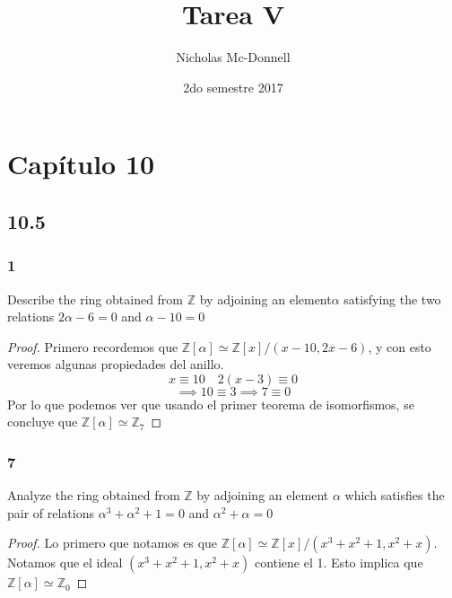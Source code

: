 \documentclass[11pt]{article}
\title{Tarea V}
\author{Nicholas Mc-Donnell}
\date{2do semestre 2017}
\newcommand{\set}[1]{\mathbb{#1}}
\theoremstyle{definition}
\begin{document}
        \maketitle
        \newpage
        
        \clearpage\null\newpage

        \tableofcontents
        \newpage

        \clearpage\null\newpage
        
        \section{Capítulo 10}
        \subsection{10.5}
        \subsubsection{1}
        Describe the ring obtained from $\set{Z}$ by adjoining an element$\alpha$ satisfying the two relations $2\alpha-6=0$ and $\alpha-10=0$
        \begin{proof}
            Primero recordemos que $\set{Z}[\alpha]\simeq\set{Z}[x]/(x-10,2x-6)$, y con esto veremos algunas propiedades del anillo.
            \[x\equiv 10\quad2(x-3)\equiv0\]
            \[\implies 10\equiv 3\implies 7\equiv 0\]
            Por lo que podemos ver que usando el primer teorema de isomorfismos, se concluye que $\set{Z}[\alpha]\simeq\set{Z}_7$
        \end{proof}

        \subsubsection{7}
        Analyze the ring obtained from $\set{Z}$ by adjoining an element $\alpha$ which satisfies the pair of relations $\alpha^3+\alpha^2+1=0$ and $\alpha^2+\alpha=0$
        \begin{proof}
            Lo primero que notamos es que $\set{Z}[\alpha]\simeq\set{Z}[x]/(x^3+x^2+1,x^2+x)$. Notamos que el ideal $(x^3+x^2+1,x^2+x)$ contiene el 1. Esto implica que $\set{Z}[\alpha]\simeq\set{Z}_0$
        \end{proof}
\end{document}
